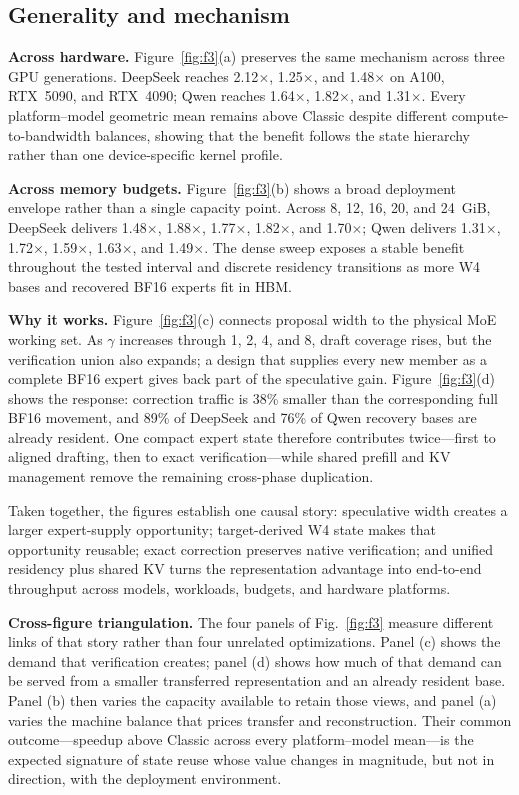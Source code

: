 \subsection{Generality and mechanism}

\textbf{Across hardware.} Figure~\ref{fig:f3}(a) preserves the same mechanism across
three GPU generations. DeepSeek reaches 2.12$\times$, 1.25$\times$, and 1.48$\times$
on A100, RTX~5090, and RTX~4090; Qwen reaches 1.64$\times$, 1.82$\times$, and
1.31$\times$. Every platform--model geometric mean remains above Classic despite
different compute-to-bandwidth balances, showing that the benefit follows the state
hierarchy rather than one device-specific kernel profile.

\textbf{Across memory budgets.} Figure~\ref{fig:f3}(b) shows a broad deployment
envelope rather than a single capacity point. Across 8, 12, 16, 20, and 24~GiB,
DeepSeek delivers 1.48$\times$, 1.88$\times$, 1.77$\times$, 1.82$\times$, and
1.70$\times$; Qwen delivers 1.31$\times$, 1.72$\times$, 1.59$\times$,
1.63$\times$, and 1.49$\times$. The dense sweep exposes a stable benefit throughout
the tested interval and discrete residency transitions as more W4 bases and recovered
BF16 experts fit in HBM.

\textbf{Why it works.} Figure~\ref{fig:f3}(c) connects proposal width to the physical
MoE working set. As $\gamma$ increases through 1, 2, 4, and 8, draft coverage rises,
but the verification union also expands; a design that supplies every new member as a
complete BF16 expert gives back part of the speculative gain. Figure~\ref{fig:f3}(d)
shows the response: correction traffic is 38\% smaller than the corresponding full
BF16 movement, and 89\% of DeepSeek and 76\% of Qwen recovery bases are already
resident. One compact expert state therefore contributes twice---first to aligned
drafting, then to exact verification---while shared prefill and KV management remove
the remaining cross-phase duplication.

Taken together, the figures establish one causal story: speculative width creates a
larger expert-supply opportunity; target-derived W4 state makes that opportunity
reusable; exact correction preserves native verification; and unified residency plus
shared KV turns the representation advantage into end-to-end throughput across
models, workloads, budgets, and hardware platforms.

\textbf{Cross-figure triangulation.} The four panels of Fig.~\ref{fig:f3} measure
different links of that story rather than four unrelated optimizations. Panel (c)
shows the demand that verification creates; panel (d) shows how much of that demand
can be served from a smaller transferred representation and an already resident
base. Panel (b) then varies the capacity available to retain those views, and panel
(a) varies the machine balance that prices transfer and reconstruction. Their common
outcome---speedup above Classic across every platform--model mean---is the expected
signature of state reuse whose value changes in magnitude, but not in direction,
with the deployment environment.


